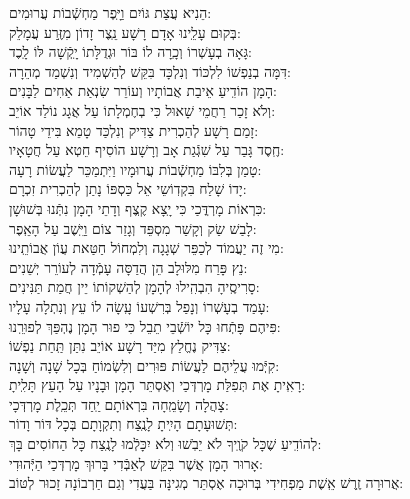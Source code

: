 \documentclass[twoside, openany, parskip=half, 11pt]{book}
\begin{document}
	 הֵנִיא עֲצַת גּוֹיִם 	וַיָּֽפֶר מַחְשְֿׁבוֹת עֲרוּמִים: \\
	בְּקוּם עָלֵֽינוּ אָדָם רָשָׁע 	נֵֽצֶר זָדוֹן מִזֶּֽרַע עֲמָלֵק: \\
	גָּאָה בְעָשְׁרוֹ וְכָֽרָה לוֹ בּוֹר 	וּגְדֻלָּתוֹ יָֽקְֿשָׁה לּוֹ לָֽכֶד: \\
	דִּמָּה בְנַפְשׁוֹ לִלְכּוֹד וְנִלְכָּד 	בִּקֵּשׁ לְהַשְׁמִיד וְנִשְׁמַד מְהֵרָה: \\
	הָמָן הוֹדִֽיעַ אֵיבַת אֲבוֹתָיו 	וְעוֹרֵר שִׂנְאַת אַחִים לַבָּנִים: \\
	וְלֹא זָכַר רַחֲמֵי שָׁאוּל 	כִּי בְחֶמְלָתוֹ עַל אֲגָג נוֹלַד אוֹיֵב: \\
	זָמַם רָשָׁע לְהַכְרִית צַדִּיק 	וְנִלְכַּד טָמֵא בִּידֵי טָהוֹר: \\
	חֶֽסֶד גָּבַר עַל שִׁגְֿגַת אָב 	וְרָשָׁע הוֹסִיף חֵטְא עַל חֲטָאָיו: \\
	טָמַן בְּלִבּוֹ מַחְשְֿׁבוֹת עֲרוּמָיו 	וַיִּתְמַכֵּר לַעֲשׂוֹת רָעָה: \\
	יָדוֹ שָׁלַח בִּקְדֽוֹשֵי אֵל 	כַּסְפּוֹ נָתַן לְהַכְרִית זִכְרָם: \\
	כִּרְאוֹת מָרְדֳּכַי כִּי יָֽצָא קֶֽצֶף 	וְדָתֵי הָמָן נִתְּֿנוּ בְּשׁוּשָׁן: \\
	לָבַשׁ שַׂק וְקָשַׁר מִסְפֵּד 	וְגָזַר צוֹם וַיֵּֽשֶׁב עַל הָאֵֽפֶר: \\
	מִי זֶה יַעֲמוֹד לְכַפֵּר שְׁגָגָה 	וְלִמְחוֹל חַטַּאת עֲוֹן אֲבוֹתֵֽינוּ: \\
	נֵץ פָּרַח מִלּוּלָב 	הֵן הֲדַסָּה עָמְֿדָה לְעוֹרֵר יְשֵׁנִים: \\
	סָרִיסֶֽיהָ הִבְהִֽילוּ לְהָמָן 	לְהַשְׁקוֹתוֹ יֵין חֲמַת תַּנִּינִים: \\
	עָמַד בְעָשְׁרוֹ וְנָפַל בְּרִשְׁעוֹ 	עָֽשָׂה לוֹ עֵץ וְנִתְלָה עָלָיו: \\
	פִּיהֶם פָּתְֿחוּ כָּל יוֹשְֿׁבֵי תֵבֵל 	כִּי פוּר הָמָן נֶהְפַּךְ לְפוּרֵֽנוּ: \\
	צַדִּיק נֶחֱלַץ מִיַּד רָשָׁע 	אוֹיֵב נִתַּן תַּֽחַת נַפְשׁוֹ: \\
	קִיְּֿמוּ עֲלֵיהֶם לַעֲשׂוֹת פּוּרִים 	וְלִשְׂמוֹחַ בְּכָל שָׁנָה וְשָׁנָה: \\
	רָאִֽיתָ אֶת תְּפִלַּת מָרְדְּכַי וְאֶסְתֵּר 	הָמָן וּבָנָיו עַל הָעֵץ תָּלִֽיתָ:\\
 צָהֲלָה וְשָׂמֵֽחָה בִּרְאוֹתָם יַֽחַד תְּכֵֽלֶת מָרְדְּכָי:\\
  תְּשׁוּעָתָם הָיִֽיתָ לָנֶֽצַח וְתִקְוָתָם בְּכָל דּוֹר וָדוֹר:\\
   לְהוֹדִֽיעַ שֶׁכָּל קֹוֶֽיךָ לֹא יֵבֹֽשׁוּ וְלֹא יִכָּלְֿמוּ לָנֶֽצַח כָּל הַחוֹסִים בָּךְ:\\
    אָרוּר הָמָן אֲשֶׁר בִּקֵּשׁ לְאַבְּֿדִי בָּרוּךְ מָרְדְּכַי הַיְּֿהוּדִי:\\
     אֲרוּרָה זֶֽרֶשׁ אֵֽשֶׁת מַפְחִידִי בְּרוּכָה אֶסְתֵּר מְגִינָּה בַּעֲדִי וְגַם חַרְבוֹנָה זָכוּר לְטּוֹב:
\end{document}

